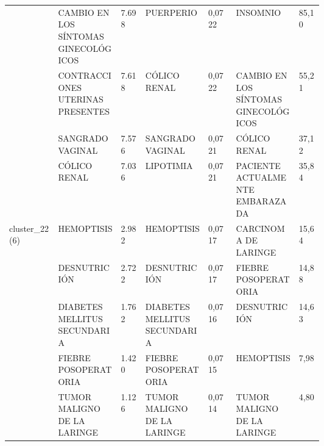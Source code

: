 \begin{landscape}
\begin{longtable}[c]{@{}lp{0.2\linewidth}lp{0.2\linewidth}lp{0.2\linewidth}l@{}}
                                  & CAMBIO EN LOS SÍNTOMAS GINECOLÓGICOS                          & 7.698  & PUERPERIO                                              & 0,0722 & INSOMNIO                                                      & 85,10    \\
                                  & CONTRACCIONES UTERINAS PRESENTES                              & 7.618  & CÓLICO RENAL                                           & 0,0722 & CAMBIO EN LOS SÍNTOMAS GINECOLÓGICOS                          & 55,21    \\
                                  & SANGRADO VAGINAL                                              & 7.576  & SANGRADO VAGINAL                                       & 0,0721 & CÓLICO RENAL                                                  & 37,12    \\
                                  & CÓLICO RENAL                                                  & 7.036  & LIPOTIMIA                                              & 0,0721 & PACIENTE ACTUALMENTE EMBARAZADA                               & 35,84    \\
\multirow{6}{*}{cluster\_22(6)}   & HEMOPTISIS                                                    & 2.982  & HEMOPTISIS                                             & 0,0717 & CARCINOMA DE LARINGE                                          & 15,64    \\
                                  & DESNUTRICIÓN                                                  & 2.722  & DESNUTRICIÓN                                           & 0,0717 & FIEBRE POSOPERATORIA                                          & 14,88    \\
                                  & DIABETES MELLITUS SECUNDARIA                                  & 1.762  & DIABETES MELLITUS SECUNDARIA                           & 0,0716 & DESNUTRICIÓN                                                  & 14,63    \\
                                  & FIEBRE POSOPERATORIA                                          & 1.420  & FIEBRE POSOPERATORIA                                   & 0,0715 & HEMOPTISIS                                                    & 7,98     \\
                                  & TUMOR MALIGNO DE LA LARINGE                                   & 1.126  & TUMOR MALIGNO DE LA LARINGE                            & 0,0714 & TUMOR MALIGNO DE LA LARINGE                                   & 4,80     \\

\end{longtable}
\end{landscape}
